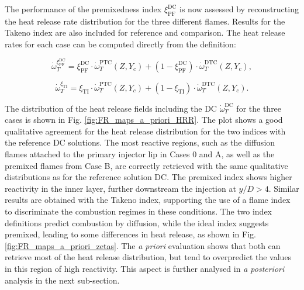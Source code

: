 \documentclass[preprint,12pt,authoryear]{elsarticle}
\begin{document}
{The performance of the premixedness index $\xi_\mathrm{PF}^\mathrm{DC}$ is now assessed by reconstructing the heat release rate distribution for the  three different flames. Results for the Takeno index are also included for reference and comparison. The heat release rates for each case can be computed directly from the definition:



    \begin{equation}
    \label{eq:HRR_reconstr_PF}
    \dot{\omega}^{\xi_\mathrm{PF}^\mathrm{DC}}_{T} = \xi_\mathrm{PF}^\mathrm{DC} \cdot  \dot{\omega}_{T}^\mathrm{PTC} \left( Z, Y_c \right) + \left( 1 -  \xi_\mathrm{PF}^\mathrm{DC} \right) \cdot  \dot{\omega}_{T}^\mathrm{DTC} \left( Z, Y_c \right), 
    \end{equation}


    \begin{equation}
    \label{eq:HRR_reconstr_TI}
    \dot{\omega}^{\xi_\mathrm{TI}}_{T} = \xi_\mathrm{TI} \cdot  \dot{\omega}_{T}^\mathrm{PTC} \left( Z, Y_c \right) + \left( 1 -  \xi_\mathrm{TI} \right) \cdot  \dot{\omega}_{T}^\mathrm{DTC} \left( Z, Y_c \right).
    \end{equation}

The distribution of the heat release fields including the DC $\dot{\omega}_{T}^\mathrm{DC}$ for the three cases is shown in Fig. \ref{fig:FR_maps_a_priori_HRR}. The plot shows a good qualitative agreement for the heat release distribution for the two indices with the reference DC solutions. The most reactive regions, such as the diffusion flames attached to the primary injector lip in Cases 0 and A, as well as the premixed flames from Case B, are correctly retrieved with the same qualitative distributions as for the reference solution DC. The premixed index shows higher reactivity in the inner layer, further downstream the injection at $y/D > 4$. Similar results are obtained with the Takeno index, supporting the use of a flame index to discriminate the combustion regimes in these conditions. The two index definitions predict combustion by diffusion, while the ideal index suggests premixed, leading to some differences in heat release, as shown in Fig. \ref{fig:FR_maps_a_priori_zetas}. The \textsl{a priori} evaluation shows that both can retrieve most of the heat release distribution, but tend to overpredict the values in this region of high reactivity. This aspect is further analysed in \textsl{a posteriori} analysis in the next sub-section. 


}
\end{document}
